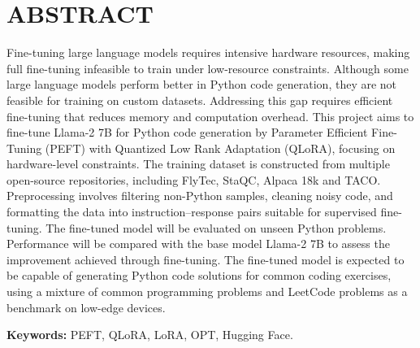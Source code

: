 \chapter*{ABSTRACT}
\onehalfspacing %
Fine-tuning large language models requires intensive hardware resources, making full fine-tuning infeasible to train under low-resource constraints. Although some large language models perform better in Python code generation, they are not feasible for training on custom datasets. Addressing this gap requires efficient fine-tuning that reduces memory and computation overhead. This project aims to fine-tune Llama-2 7B for Python code generation by Parameter Efficient Fine-Tuning (PEFT) with Quantized Low Rank Adaptation (QLoRA), focusing on hardware-level constraints. The training dataset is constructed from multiple open-source repositories, including FlyTec, StaQC, Alpaca 18k and TACO. Preprocessing involves filtering non-Python samples, cleaning noisy code, and formatting the data into instruction–response pairs suitable for supervised fine-tuning. The fine-tuned model will be evaluated on unseen Python problems. Performance will be compared with the base model Llama-2 7B to assess the improvement achieved through fine-tuning. The fine-tuned model is expected to be capable of generating Python code solutions for common coding exercises, using a mixture of common programming problems and LeetCode problems as a benchmark on low-edge devices.

\vspace{1cm}
\noindent \textbf{Keywords:} PEFT, QLoRA, LoRA, OPT, Hugging Face.

